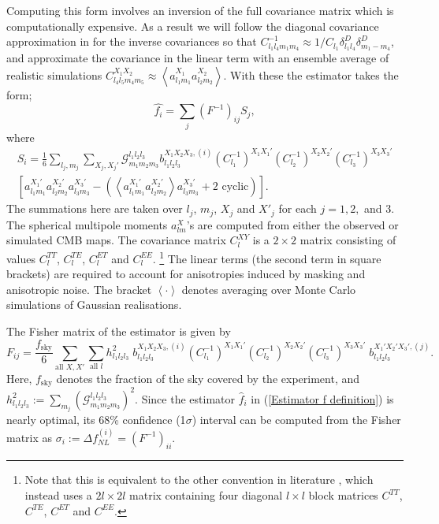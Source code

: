 \documentclass[a4paper,12pt,times,custombib,print,index]{Classes/PhDThesisPSnPDF} %
\providecommand{\DIFadd}[1]{{\protect\color{blue}\uwave{#1}}} %
\providecommand{\DIFdel}[1]{{\protect\color{red}\sout{#1}}}                      %
\providecommand{\DIFaddbegin}{} %
\providecommand{\DIFaddend}{} %
\providecommand{\DIFdelbegin}{} %
\providecommand{\DIFdelend}{} %
\newcommand{\DIFscaledelfig}{0.5}
\newlength{\DIFdelgraphicswidth} %
\newlength{\DIFdelgraphicsheight} %
\newcommand{\DIFaddincludegraphics}[2][]{{\color{blue}\fbox{\DIFOincludegraphics[#1]{#2}}}} %
\newcommand{\DIFdelincludegraphics}[2][]{%
\sbox{\DIFdelgraphicsbox}{\DIFOincludegraphics[#1]{#2}}%
\settoboxwidth{\DIFdelgraphicswidth}{\DIFdelgraphicsbox} %
\settoboxtotalheight{\DIFdelgraphicsheight}{\DIFdelgraphicsbox} %
\scalebox{\DIFscaledelfig}{%
\parbox[b]{\DIFdelgraphicswidth}{\usebox{\DIFdelgraphicsbox}\\[-\baselineskip] \rule{\DIFdelgraphicswidth}{0em}}\llap{\resizebox{\DIFdelgraphicswidth}{\DIFdelgraphicsheight}{%
\setlength{\unitlength}{\DIFdelgraphicswidth}%
\begin{picture}(1,1)%
\thicklines\linethickness{2pt} %
{\color[rgb]{1,0,0}\put(0,0){\framebox(1,1){}}}%
{\color[rgb]{1,0,0}\put(0,0){\line( 1,1){1}}}%
{\color[rgb]{1,0,0}\put(0,1){\line(1,-1){1}}}%
\end{picture}%
}\hspace*{3pt}}} %
} %
\DeclareRobustCommand{\DIFaddbegin}{\DIFOaddbegin \let\includegraphics\DIFaddincludegraphics} %
\DeclareRobustCommand{\DIFaddend}{\DIFOaddend \let\includegraphics\DIFOincludegraphics} %
\DeclareRobustCommand{\DIFdelbegin}{\DIFOdelbegin \let\includegraphics\DIFdelincludegraphics} %
\DeclareRobustCommand{\DIFdelend}{\DIFOaddend \let\includegraphics\DIFOincludegraphics} %
\begin{document}
Computing this form involves an inversion of the full covariance matrix which is computationally expensive. As a result we will follow the diagonal covariance approximation in \cite{Yadav2007} for the inverse covariances so that {$C_{l_1 l_4 m_1 m_4}^{-1} \approx 1/C_{l_1}  \delta^D_{l_1 l_4} \delta^D_{m_1 -m_4}$}, and approximate the covariance in the linear term with an ensemble average of realistic simulations  {$C_{l_4 l_5 m_4 m_5}^{X_1 X_2} \approx \left< a_{l_1 m_1}^{X_1} a_{l_2 m_2}^{X_2} \right>$}.  With these the estimator takes the form;
\begin{equation}
	\hat{f_i} = \sum_j (F^{-1})_{ij} S_j,
	\label{Estimator f definition}
\end{equation}
where
\begin{eqnarray}
	S_i =  \frac{1}{6} \sum_{l_j, m_j} \sum_{X_j, X_j'} \mathcal{G}_{m_1 m_2 m_3}^{l_1 l_2 l_3} b_{l_1 l_2 l_3} ^{X_1 X_2 X_3, (i)} (C_{l_1}^{-1})^{X_1 X_1'} (C_{l_2}^{-1})^{X_2 X_2'} (C_{l_3}^{-1})^{X_3 X_3'} \nonumber \\  \left[ a_{l_1 m_1}^{X_1'} a_{l_2 m_2}^{X_2'} a_{l_3 m_3}^{X_3'} -  \left( \left< a_{l_1 m_1}^{X_1'} a_{l_2 m_2}^{X_2'} \right> a_{l_3 m_3}^{X_3'} + \text{2 cyclic} \right)   \right].
	\label{Estimator S definition}
\end{eqnarray}
The summations here are taken over $l_j$, $m_j$, $X_j$ and $X'_j$ for each $j=1,2,$ and $3$. The spherical multipole moments $a_{lm}^{X}$'s are computed from either the observed or simulated CMB maps. The covariance matrix $C_l^{XY}$ is a $2\times2$ matrix consisting of values $C_l^{TT}$, $C_l^{TE}$, $C_l^{ET}$ and $C_l^{EE}$. \footnote{Note that this is equivalent to the other convention in literature \cite{Fergusson2014}, which instead uses a $2l\times2l$ matrix containing four diagonal $l\times l$ block matrices $C^{TT}$, $C^{TE}$, $C^{ET}$ and $C^{EE}$.} The linear terms (the second term in square brackets) are required to account for anisotropies induced by masking and anisotropic noise. The bracket $\left< \cdot \right>$ denotes averaging over Monte Carlo simulations of Gaussian realisations.

The Fisher matrix of the estimator is given by
\begin{equation}
	F_{ij}= \frac{f_\text{sky}}{6} \sum_{\text{all }X, X'} \sum_{\text{all }l} h_{l_1 l_2 l_3}^2 \; b_{l_1 l_2 l_3}^{X_1 X_2 X_3, (i)} (C_{l_1}^{-1})^{X_1 X_1'} (C_{l_2}^{-1})^{X_2 X_2'} (C_{l_3}^{-1})^{X_3 X_3'} \; b_{l_1 l_2 l_3}^{X_1' X_2' X_3', (j)}.
	\label{Estimator F definition}
\end{equation}
Here, $f_\text{sky}$ denotes the fraction of the sky covered by the experiment, and $h_{l_1 l_2 l_3}^2 := \sum_{m_j} \left( \mathcal{G}_{m_1 m_2 m_3}^{l_1 l_2 l_3} \right) ^2$. Since the estimator $\hat{f}_i$ in (\ref{Estimator f definition}) is nearly optimal, its 68\% confidence (1$\sigma$) interval can be computed from the Fisher matrix as \DIFdelbegin \DIFdel{$\sigma_i := \Delta f_{NL}^{(i)} = (F^{-1})_{ii}$}\DIFdelend \DIFaddbegin \DIFadd{$\sigma_i := \Delta f_\text{NL}^{(i)} = (F^{-1})_{ii}$}\DIFaddend .
\end{document}
